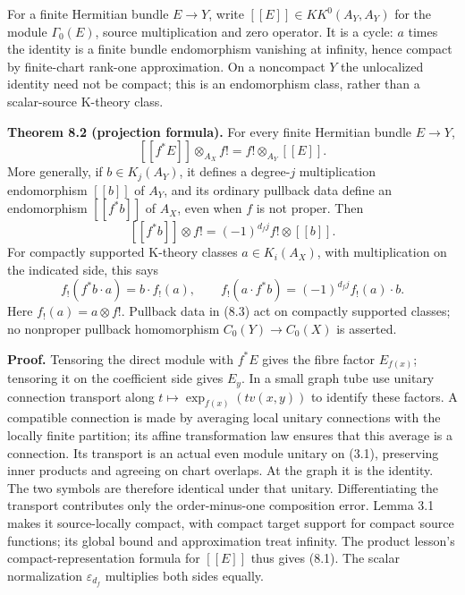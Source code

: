\documentclass[
  11pt,
]{article}
\begin{document}
For a finite Hermitian bundle \(E\to Y\), write
\([[E]]\in KK^0(A_Y,A_Y)\) for the module \(\Gamma_0(E)\), source
multiplication and zero operator. It is a cycle: \(a\) times the
identity is a finite bundle endomorphism vanishing at infinity, hence
compact by finite-chart rank-one approximation. On a noncompact \(Y\)
the unlocalized identity need not be compact; this is an endomorphism
class, rather than a scalar-source K-theory class.

\textbf{Theorem 8.2 (projection formula).} For every finite Hermitian
bundle \(E\to Y\), \[
 [[f^*E]]\otimes_{A_X}f!=f!\otimes_{A_Y}[[E]].
 \tag{8.1}
\] More generally, if \(b\in K_j(A_Y)\), it defines a degree-\(j\)
multiplication endomorphism \([[b]]\) of \(A_Y\), and its ordinary
pullback data define an endomorphism \([[f^*b]]\) of \(A_X\), even when
\(f\) is not proper. Then \[
 [[f^*b]]\otimes f!=(-1)^{d_fj}f!\otimes[[b]].
 \tag{8.2}
\] For compactly supported K-theory classes \(a\in K_i(A_X)\), with
multiplication on the indicated side, this says \[
 f_!(f^*b\cdot a)=b\cdot f_!(a),\qquad
 f_!(a\cdot f^*b)=(-1)^{d_fj}f_!(a)\cdot b.
 \tag{8.3}
\] Here \(f_!(a)=a\otimes f!\). Pullback data in (8.3) act on compactly
supported classes; no nonproper pullback homomorphism
\(C_0(Y)\to C_0(X)\) is asserted.

\textbf{Proof.} Tensoring the direct module with \(f^*E\) gives the
fibre factor \(E_{f(x)}\); tensoring it on the coefficient side gives
\(E_y\). In a small graph tube use unitary connection transport along
\(t\mapsto\exp_{f(x)}(t v(x,y))\) to identify these factors. A
compatible connection is made by averaging local unitary connections
with the locally finite partition; its affine transformation law ensures
that this average is a connection. Its transport is an actual even
module unitary on (3.1), preserving inner products and agreeing on chart
overlaps. At the graph it is the identity. The two symbols are therefore
identical under that unitary. Differentiating the transport contributes
only the order-minus-one composition error. Lemma 3.1 makes it
source-locally compact, with compact target support for compact source
functions; its global bound and approximation treat infinity. The
product lesson's compact-representation formula for \([[E]]\) thus gives
(8.1). The scalar normalization \(\varepsilon_{d_f}\) multiplies both
sides equally.
\end{document}
